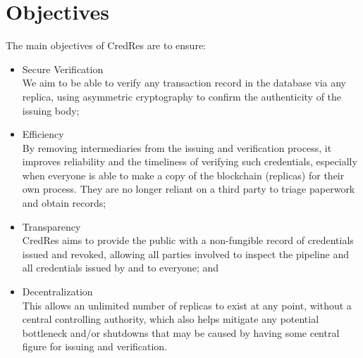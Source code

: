 \section{Objectives}
The main objectives of CredRes are to ensure:
\begin{itemize}
    \item Secure Verification \\
        We aim to be able to verify any transaction record in the database via any replica, using
        asymmetric cryptography to confirm the authenticity of the issuing body;
    \item Efficiency \\
        By removing intermediaries from the issuing and verification process, it improves
        reliability and the timeliness of verifying such credentials, especially when everyone is
        able to make a copy of the blockchain (replicas) for their own process. They are no longer
        reliant on a third party to triage paperwork and obtain records;
    \item Transparency \\
        CredRes aims to provide the public with a non-fungible record of credentials issued and
        revoked, allowing all parties involved to inspect the pipeline and all credentials issued by
        and to everyone; and
    \item Decentralization \\
        This allows an unlimited number of replicas to exist at any point, without a central
        controlling authority, which also helps mitigate any potential bottleneck and/or shutdowns
        that may be caused by having some central figure for issuing and verification.
\end{itemize}

